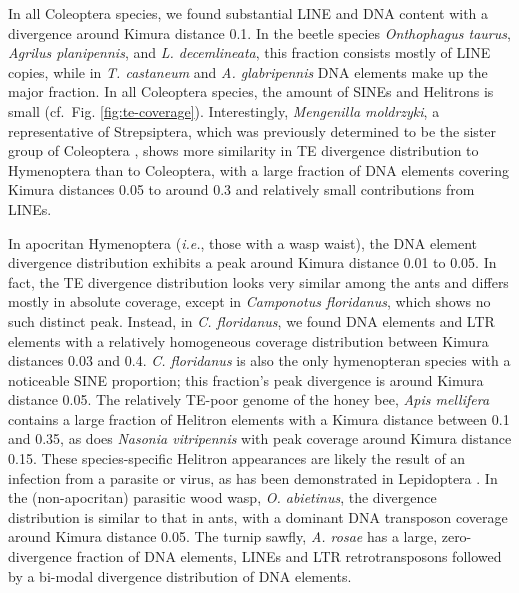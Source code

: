In all Coleoptera species, we found substantial LINE and DNA content
with a divergence around Kimura distance 0.1. In the beetle species
\emph{Onthophagus taurus}, \emph{Agrilus planipennis}, and \emph{L.
decemlineata}, this fraction consists mostly of LINE copies, while in
\emph{T. castaneum} and \emph{A.  glabripennis} DNA elements make up the
major fraction. In all Coleoptera species, the amount of SINEs and
Helitrons is small (cf.~Fig.  \ref{fig:te-coverage}). Interestingly,
\emph{Mengenilla moldrzyki}, a representative of Strepsiptera, which was
previously determined to be the sister group of Coleoptera
\citep{Niehuis2012}, shows more similarity in TE divergence distribution
to Hymenoptera than to Coleoptera, with a large fraction of DNA elements
covering Kimura distances 0.05 to around 0.3 and relatively small
contributions from LINEs.

In apocritan Hymenoptera (\emph{i.e.}, those with a wasp waist), the DNA
element divergence distribution exhibits a peak around Kimura distance
0.01 to 0.05. In fact, the TE divergence distribution looks very similar
among the ants and differs mostly in absolute coverage, except in
\emph{Camponotus floridanus}, which shows no such distinct peak.
Instead, in \emph{C. floridanus}, we found DNA elements and LTR elements
with a relatively homogeneous coverage distribution between Kimura
distances 0.03 and 0.4. \emph{C. floridanus} is also the only
hymenopteran species with a noticeable SINE proportion; this fraction's
peak divergence is around Kimura distance 0.05. The relatively TE-poor
genome of the honey bee, \emph{Apis mellifera} contains a large fraction
of Helitron elements with a Kimura distance between 0.1 and 0.35, as
does \emph{Nasonia vitripennis} with peak coverage around Kimura
distance 0.15. These species-specific Helitron appearances are likely
the result of an infection from a parasite or virus, as has been
demonstrated in Lepidoptera \citep{Coates2015}. In the (non-apocritan)
parasitic wood wasp, \emph{O. abietinus}, the divergence distribution is
similar to that in ants, with a dominant DNA transposon coverage around
Kimura distance 0.05. The turnip sawfly, \emph{A. rosae} has a large,
zero-divergence fraction of DNA elements, LINEs and LTR retrotransposons
followed by a bi-modal divergence distribution of DNA elements.


